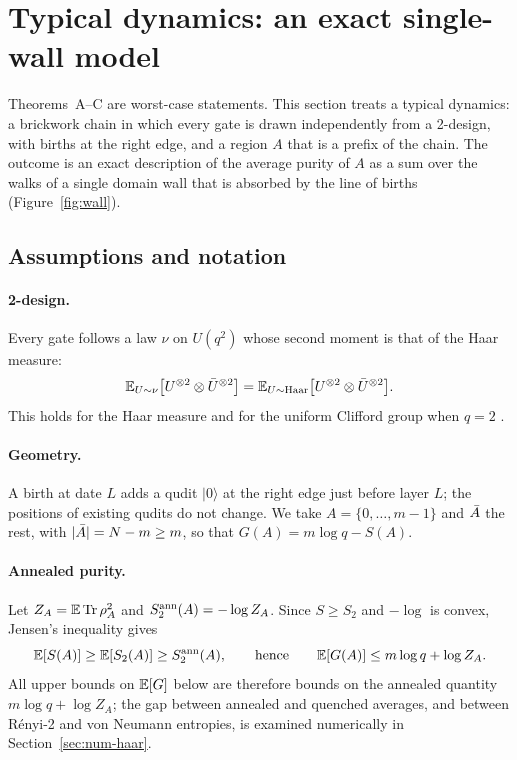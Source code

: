 \section{Typical dynamics: an exact single-wall model}\label{sec:walls}

Theorems~A--C are worst-case statements. This section treats a typical dynamics: a brickwork chain in which every gate is drawn independently from a 2-design, with births at the right edge, and a region $A$ that is a prefix of the chain. The outcome is an exact description of the average purity of $A$ as a sum over the walks of a single domain wall that is absorbed by the line of births (Figure~\ref{fig:wall}).

\subsection{Assumptions and notation}

\paragraph{2-design.} Every gate follows a law $\nu$ on $U(q^2)$ whose second moment is that of the Haar measure:
\begin{equation}\label{eq:2design}
\mathbb{E}_{U\sim\nu}\bigl[U^{\otimes2}\otimes\bar U^{\otimes2}\bigr]=\mathbb{E}_{U\sim\mathrm{Haar}}\bigl[U^{\otimes2}\otimes\bar U^{\otimes2}\bigr].
\end{equation}
This holds for the Haar measure and for the uniform Clifford group when $q=2$ \cite{DLT2002,Dankert2009,Webb2016,Zhu2017}.

\paragraph{Geometry.} A birth at date $L$ adds a qudit $|0\rangle$ at the right edge just before layer $L$; the positions of existing qudits do not change. We take $A=\{0,\dots,m-1\}$ and $\bar A$ the rest, with $|\bar A|=N-m\ge m$, so that $G(A)=m\log q-S(A)$.

\paragraph{Annealed purity.} Let $Z_A=\mathbb{E}\,\mathrm{Tr}\,\rho_A^2$ and $S_2^{\mathrm{ann}}(A)=-\log Z_A$. Since $S\ge S_2$ and $-\log$ is convex, Jensen's inequality gives
\begin{equation}\label{eq:jensen}
\mathbb{E}[S(A)]\ge\mathbb{E}[S_2(A)]\ge S_2^{\mathrm{ann}}(A),\qquad\text{hence}\qquad \mathbb{E}[G(A)]\le m\log q+\log Z_A .
\end{equation}
All upper bounds on $\mathbb{E}[G]$ below are therefore bounds on the annealed quantity $m\log q+\log Z_A$; the gap between annealed and quenched averages, and between R\'enyi-2 and von Neumann entropies, is examined numerically in Section~\ref{sec:num-haar}.

